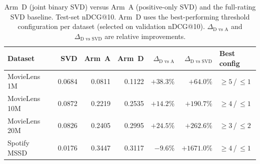 \begin{table}[ht]
\centering
\caption{Arm~D (joint binary SVD) versus Arm~A (positive-only SVD) and the
  full-rating SVD baseline. Test-set nDCG@10. Arm~D uses the best-performing
  threshold configuration per dataset (selected on validation nDCG@10).
  $\Delta_{\text{D vs A}}$ and $\Delta_{\text{D vs SVD}}$ are relative
  improvements.}
\label{tab:arm_d_vs_arm_a}
\begin{tabular}{lrrrrrl}
\toprule
Dataset       & SVD    & Arm~A  & Arm~D  & $\Delta_{\text{D vs A}}$ & $\Delta_{\text{D vs SVD}}$ & Best config \\
\midrule
MovieLens 1M  & 0.0684 & 0.0811 & 0.1122 & $+38.3\%$ & $+64.0\%$ & ${\geq}5$\,/\,${\leq}1$ \\
MovieLens 10M & 0.0872 & 0.2219 & 0.2535 & $+14.2\%$ & $+190.7\%$ & ${\geq}4$\,/\,${\leq}1$ \\
MovieLens 20M & 0.0826 & 0.2405 & 0.2995 & $+24.5\%$ & $+262.6\%$ & ${\geq}3$\,/\,${\leq}2$ \\
Spotify MSSD  & 0.0176 & 0.3447 & 0.3117 & $-9.6\%$  & $+1671.0\%$ & ${\geq}4$\,/\,${\leq}1$ \\
\bottomrule
\end{tabular}
\end{table}
